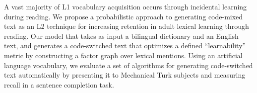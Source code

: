 A vast majority of L1 vocabulary acquisition occurs through incidental learning during reading. We propose a probabilistic approach to generating code-mixed text as an L2 technique for increasing retention in adult lexical learning through reading. Our model that takes as input a bilingual dictionary and an English text, and generates a code-switched text that optimizes a defined ``learnability'' metric by constructing a factor graph over lexical mentions. Using an artificial language vocabulary, we evaluate a set of algorithms for generating code-switched text automatically by presenting it to Mechanical Turk subjects and measuring recall in a sentence completion task.
